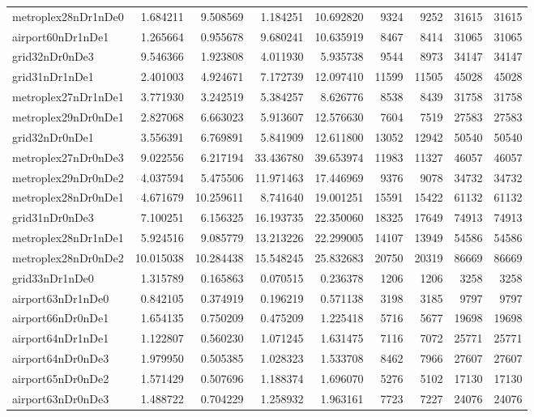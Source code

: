 \begin{longtable}{|l|r|r|r|r|r|r|r|r|}
metroplex28nDr1nDe0 & 1.684211 & 9.508569 & 1.184251 & 10.692820 & 9324 & 9252 & 31615 & 31615 \\
airport60nDr1nDe1 & 1.265664 & 0.955678 & 9.680241 & 10.635919 & 8467 & 8414 & 31065 & 31065 \\
grid32nDr0nDe3 & 9.546366 & 1.923808 & 4.011930 & 5.935738 & 9544 & 8973 & 34147 & 34147 \\
grid31nDr1nDe1 & 2.401003 & 4.924671 & 7.172739 & 12.097410 & 11599 & 11505 & 45028 & 45028 \\
metroplex27nDr1nDe1 & 3.771930 & 3.242519 & 5.384257 & 8.626776 & 8538 & 8439 & 31758 & 31758 \\
metroplex29nDr0nDe1 & 2.827068 & 6.663023 & 5.913607 & 12.576630 & 7604 & 7519 & 27583 & 27583 \\
grid32nDr0nDe1 & 3.556391 & 6.769891 & 5.841909 & 12.611800 & 13052 & 12942 & 50540 & 50540 \\
metroplex27nDr0nDe3 & 9.022556 & 6.217194 & 33.436780 & 39.653974 & 11983 & 11327 & 46057 & 46057 \\
metroplex29nDr0nDe2 & 4.037594 & 5.475506 & 11.971463 & 17.446969 & 9376 & 9078 & 34732 & 34732 \\
metroplex28nDr0nDe1 & 4.671679 & 10.259611 & 8.741640 & 19.001251 & 15591 & 15422 & 61132 & 61132 \\
grid31nDr0nDe3 & 7.100251 & 6.156325 & 16.193735 & 22.350060 & 18325 & 17649 & 74913 & 74913 \\
metroplex28nDr1nDe1 & 5.924516 & 9.085779 & 13.213226 & 22.299005 & 14107 & 13949 & 54586 & 54586 \\
metroplex28nDr0nDe2 & 10.015038 & 10.284438 & 15.548245 & 25.832683 & 20750 & 20319 & 86669 & 86669 \\
grid33nDr1nDe0 & 1.315789 & 0.165863 & 0.070515 & 0.236378 & 1206 & 1206 & 3258 & 3258 \\
airport63nDr1nDe0 & 0.842105 & 0.374919 & 0.196219 & 0.571138 & 3198 & 3185 & 9797 & 9797 \\
airport66nDr0nDe1 & 1.654135 & 0.750209 & 0.475209 & 1.225418 & 5716 & 5677 & 19698 & 19698 \\
airport64nDr1nDe1 & 1.122807 & 0.560230 & 1.071245 & 1.631475 & 7116 & 7072 & 25771 & 25771 \\
airport64nDr0nDe3 & 1.979950 & 0.505385 & 1.028323 & 1.533708 & 8462 & 7966 & 27607 & 27607 \\
airport65nDr0nDe2 & 1.571429 & 0.507696 & 1.188374 & 1.696070 & 5276 & 5102 & 17130 & 17130 \\
airport63nDr0nDe3 & 1.488722 & 0.704229 & 1.258932 & 1.963161 & 7723 & 7227 & 24076 & 24076 \\

\end{longtable}
